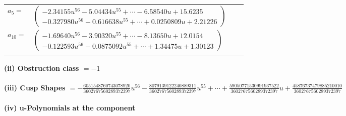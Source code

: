 \documentclass[1p]{elsarticle_modified}
\theoremstyle{definition}
\begin{document}
\begin{tabular}{m{7pt} m{180pt} m{7pt} m{180pt} }
\flushright $a_{5}=$&$\begin{pmatrix}-2.34155 u^{56}-5.04434 u^{55}+\cdots-6.58540 u+15.6235\\-0.327980 u^{56}-0.616638 u^{55}+\cdots+0.0250809 u+2.21226\end{pmatrix}$ \\
\flushright $a_{10}=$&$\begin{pmatrix}-1.69640 u^{56}-3.90320 u^{55}+\cdots-8.13650 u+12.0154\\-0.122593 u^{56}-0.0875092 u^{55}+\cdots+1.34475 u+1.30123\end{pmatrix}$\\&\end{tabular}
\flushleft \textbf{(ii) Obstruction class $= -1$}\\~\\
\flushleft \textbf{(iii) Cusp Shapes $= -\frac{6051548760743078920}{3602767560289372397} u^{56}-\frac{8079139122240889311}{3602767560289372397} u^{55}+\cdots+\frac{59050771530991937522}{3602767560289372397} u+\frac{45876737479885210010}{3602767560289372397}$}\\~\\
\newpage\renewcommand{\arraystretch}{1}
\flushleft \textbf{(iv) u-Polynomials at the component}\newline \\
\end{document}
